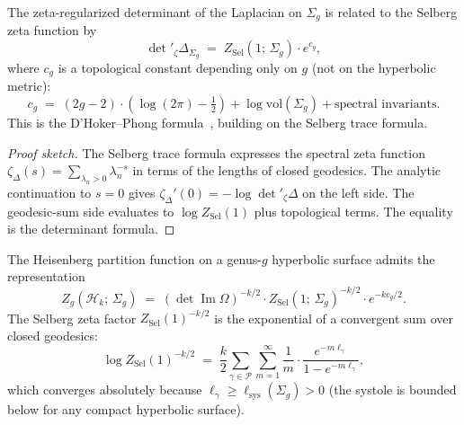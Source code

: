 \begin{theorem}
\label{thm:thqg-I-determinant-formula}
The zeta-regularized determinant of the Laplacian on $\Sigma_g$ is related to the Selberg zeta function by
\begin{equation}\label{eq:thqg-I-det-selberg}
\det{}'_\zeta \Delta_{\Sigma_g} \;=\; Z_{\mathrm{Sel}}(1;\,\Sigma_g) \cdot e^{c_g},
\end{equation}
where $c_g$ is a topological constant depending only on $g$ (not on the hyperbolic metric):
\begin{equation}\label{eq:thqg-I-topological-constant}
c_g \;=\; (2g - 2) \cdot \left( \log(2\pi) - \tfrac{1}{2} \right) + \log\mathrm{vol}(\Sigma_g) + \text{spectral invariants}.
\end{equation}
This is the D'Hoker--Phong formula~\cite{DP86}, building on the Selberg trace formula.
\end{theorem}

\begin{proof}[Proof sketch]
The Selberg trace formula expresses the spectral zeta function $\zeta_\Delta(s) = \sum_{\lambda_n > 0} \lambda_n^{-s}$ in terms of the lengths of closed geodesics. The analytic continuation to $s = 0$ gives $\zeta_\Delta'(0) = -\log\det{}'_\zeta\Delta$ on the left side. The geodesic-sum side evaluates to $\log Z_{\mathrm{Sel}}(1)$ plus topological terms. The equality is the determinant formula.
\end{proof}

\begin{corollary}
\label{cor:thqg-I-heisenberg-selberg}
The Heisenberg partition function on a genus-$g$ hyperbolic surface admits the representation
\begin{equation}\label{eq:thqg-I-heisenberg-selberg}
Z_g(\mathcal{H}_k;\,\Sigma_g) \;=\; (\det\operatorname{Im}\Omega)^{-k/2} \cdot Z_{\mathrm{Sel}}(1;\,\Sigma_g)^{-k/2} \cdot e^{-k c_g / 2}.
\end{equation}
The Selberg zeta factor $Z_{\mathrm{Sel}}(1)^{-k/2}$ is the exponential of a convergent sum over closed geodesics:
\begin{equation}\label{eq:thqg-I-selberg-expansion}
\log Z_{\mathrm{Sel}}(1)^{-k/2} \;=\; \frac{k}{2} \sum_{\gamma \in \mathcal{P}} \sum_{m=1}^{\infty} \frac{1}{m} \cdot \frac{e^{-m\ell_\gamma}}{1 - e^{-m\ell_\gamma}},
\end{equation}
which converges absolutely because $\ell_\gamma \geq \ell_{\mathrm{sys}}(\Sigma_g) > 0$ (the systole is bounded below for any compact hyperbolic surface).
\end{corollary}


